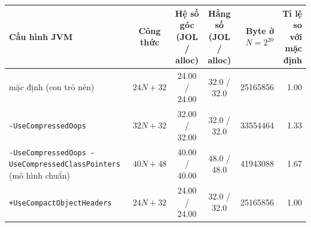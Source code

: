 \begin{tabularx}{\linewidth}{Xcccrr}
\toprule
Cấu hình JVM & Công thức & \makecell{Hệ số góc \\ (JOL / alloc)} & \makecell{Hằng số \\ (JOL / alloc)} & \makecell{Byte ở \\ $N{=}2^{20}$} & \makecell{Tỉ lệ so \\ với mặc định} \\
\midrule
mặc định (con trỏ nén) & $24N + 32$ & 24.00 / 24.00 & 32.0 / 32.0 & \num{25165856} & 1.00 \\
\texttt{-UseCompressedOops} & $32N + 32$ & 32.00 / 32.00 & 32.0 / 32.0 & \num{33554464} & 1.33 \\
\texttt{-UseCompressedOops -UseCompressedClassPointers} (mô hình chuẩn) & $40N + 48$ & 40.00 / 40.00 & 48.0 / 48.0 & \num{41943088} & 1.67 \\
\texttt{+UseCompactObjectHeaders} & $24N + 32$ & 24.00 / 24.00 & 32.0 / 32.0 & \num{25165856} & 1.00 \\
\bottomrule
\end{tabularx}
